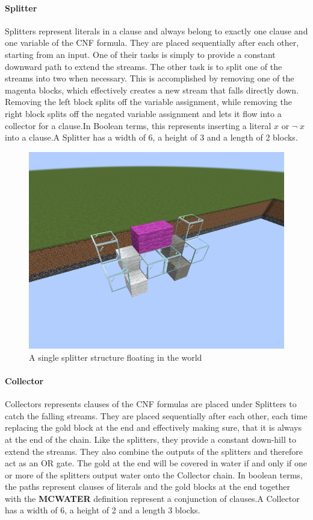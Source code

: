 \paragraph{Splitter} \label{splitter}
Splitters represent literals in a clause and always belong to  exactly one clause and one variable of the CNF formula. They are placed sequentially after each other, starting from an input. One of their tasks is simply to provide a constant downward path to extend the streams. The other task is to split one of the streams into two when necessary. This is accomplished by removing one of the magenta blocks, which effectively creates a new stream that falls directly down. Removing the left block splits off the variable assignment, while removing the right block splits off the negated variable assignment and lets it flow into a collector for a clause.\newline In Boolean terms, this represents inserting a literal $x$ or $\neg \; x$ into a clause.\newline A Splitter has a width of 6, a height of 3 and a length of 2 blocks.

\begin{figure}[h]
    \centering
    \includegraphics[width=0.5\linewidth]{images/splitter.png}
    \caption{A single splitter structure floating in the world}
    \label{fig:splitter}
\end{figure}

\pagebreak
    
\paragraph{Collector} \label{collector}
Collectors represents clauses of the CNF formulas are placed under Splitters to catch the falling streams. They are placed sequentially after each other, each time replacing the gold block at the end and effectively making sure, that it is always at the end of the chain. Like the splitters, they provide a constant down-hill to extend the streams. They also combine the outputs of the splitters and therefore act as an OR gate. The gold at the end will be covered in water if and only if one or more of the splitters output water onto the Collector chain. In boolean terms, the paths represent clauses of literals and the gold blocks at the end together with the \textbf{MCWATER} definition represent a conjunction of clauses.\newline A Collector has a width of 6, a height of 2 and a length 3 blocks.

